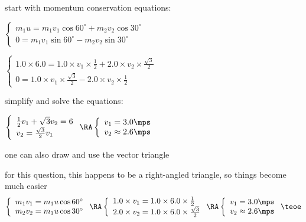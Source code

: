 
\sol start with momentum conservation equations:

\eqskip$\left\{\begin{array}{l}
	m_1 u = m_1 v_1 \cos60^\circ + m_2 v_2 \cos30^\circ \\
	0 = m_1 v_1 \sin60^\circ - m_2 v_2 \sin30^\circ
	\end{array} \right. $

\eqskip $ \left\{\begin{array}{l}
	1.0\times6.0 = 1.0 \times v_1 \times \frac{1}{2} + 2.0 \times v_2 \times \frac{\sqrt{3}}{2}  \\
	0 = 1.0 \times v_1 \times \frac{\sqrt{3}}{2} - 2.0 \times v_2 \times \frac{1}{2}
	\end{array} \right. $

\eqyskip simplify and solve the equations:

\eqskip $ \left\{\begin{array}{l}
\frac{1}{2} v_1 + \sqrt{3} v_2 = 6 \\
v_2 =  \frac{\sqrt{3}}{2} v_1
\end{array} \right. \RA 
\left\{\begin{array}{l}
v_1 = 3.0 \mps \\
v_2 \approx 2.6 \mps
\end{array} \right.$

\eqyskip one can also draw and use the vector triangle

for this question, this happens to be a right-angled triangle, so things become much easier
\begin{equation*}
	\left\{\begin{array}{l}
	m_1 v_1 = m_1 u \cos 60^\circ \\
	m_2 v_2 = m_1 u \cos 30^\circ
	\end{array} \right. \RA 
	\left\{\begin{array}{l}
	1.0\times v_1 = 1.0 \times 6.0 \times \frac{1}{2} \\
	2.0\times v_2 = 1.0 \times 6.0 \times \frac{\sqrt{3}}{2}
	\end{array} \right.	\RA 
	\left\{\begin{array}{l}
	v_1 = 3.0 \mps \\
	v_2 \approx 2.6 \mps
	\end{array} \right.  \teoe
\end{equation*}


